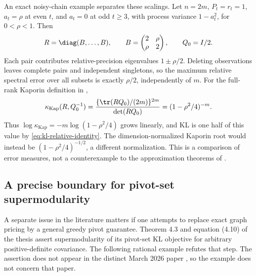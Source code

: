 An exact noisy-chain example separates these scalings. Let $n=2m$,
$P_t=r_t=1$, $a_t=\rho$ at even $t$, and $a_t=0$ at odd $t\ge3$,
with process variance $1-a_t^2$, for $0<\rho<1$. Then
\[
 R=\diag(B,\ldots,B),\qquad
 B=\begin{pmatrix}2&\rho\\\rho&2\end{pmatrix},\qquad Q_0=I/2.
\]
Each pair contributes relative-precision eigenvalues $1\pm\rho/2$.
Deleting observations leaves complete pairs and independent singletons,
so the maximum relative spectral error over all subsets is exactly
$\rho/2$, independently of $m$. For the full-rank Kaporin definition in
\citet[Definition 1.1]{KaminetzWebber2026},
\begin{equation}
 \kappa_{\mathrm{Kap}}(R,Q_0^{-1})
 =\frac{\{\tr(RQ_0)/(2m)\}^{2m}}{\det(RQ_0)}
 =(1-\rho^2/4)^{-m}.
 \label{eq:kaporin-pairs}
\end{equation}
Thus $\log\kappa_{\mathrm{Kap}}=-m\log(1-\rho^2/4)$ grows linearly,
and KL is one half of this value by \eqref{eq:kl-relative-identity}.
The dimension-normalized Kaporin root would instead be
$(1-\rho^2/4)^{-1/2}$, a different normalization. This is a comparison
of error measures, not a counterexample to the approximation theorems of
\citet{KaminetzWebber2026}.

\subsection{A precise boundary for pivot-set supermodularity}
\label{app:pivot-supermodularity}
A separate issue in the literature matters if one attempts to replace exact
graph pricing by a general greedy pivot guarantee. Theorem 4.3 and equation
(4.10) of the thesis \citep{KaminetzThesis2025} assert supermodularity of its
pivot-set KL objective for arbitrary positive-definite covariance. The
following rational example refutes that step. The assertion does not appear
in the distinct March 2026 paper \citep{KaminetzWebber2026}, so the example
does not concern that paper.

